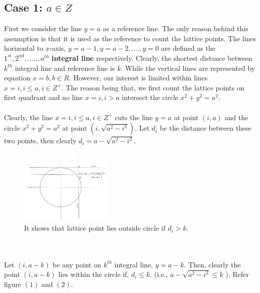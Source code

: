 \documentclass[journal,twoside]{IEEEtran}
\begin{document}
\subsection{Case 1: $a \in Z$}
First we consider the line $y=a$ as a reference line. The only reason behind this assumption is that it is used as the reference to count the lattice points. The lines horizontal to $x$-axis, $y=a-1, y=a-2,....,y=0$ are defined as the $1^{st}, 2^{nd},....., a^{th}$ \textbf{integral line} respectively. Clearly, the shortest distance between $k^{th}$ integral line and reference line is $k.$ While the vertical lines are represented by equation $x=b, b \in R$. However, our interest is limited within lines $x=i,i \leq a,i \in Z^{+}$. The reason being that, we first count the lattice points on first quadrant and no line $x=i,i > a$ intersect the circle $x^{2}+y^{2}=a^{2}$.
\\\\ Clearly, the line $x=i, i \leq a, i \in Z^{+}$ cuts the line $y=a$ at point $(i,a)$ and the circle $x^{2}+y^{2}=a^{2}$ at point $(i, \sqrt{a^{2}-i^{2}})$. Let $d_{i}$ be the distance between these two points, then clearly $d_{i} = a- \sqrt{a^{2}-i^{2}}$.
\begin{figure}[h]
\caption{It shows that lattice point lies outside circle if $d_{i}>k$.}
\centering
\includegraphics[width=0.4\textwidth]{diag2}
\end{figure}
\\\\ Let $(i,a-k)$ be any point on $k^{th}$ integral line, $y=a-k$. Then, clearly the point $(i, a-k)$ lies within the circle if, $d_{i} \leq k$. (i.e., $a- \sqrt{a^{2}-i^{2}} \leq k$ ). Refer figure $(1)$ and $(2)$.
\end{document}
